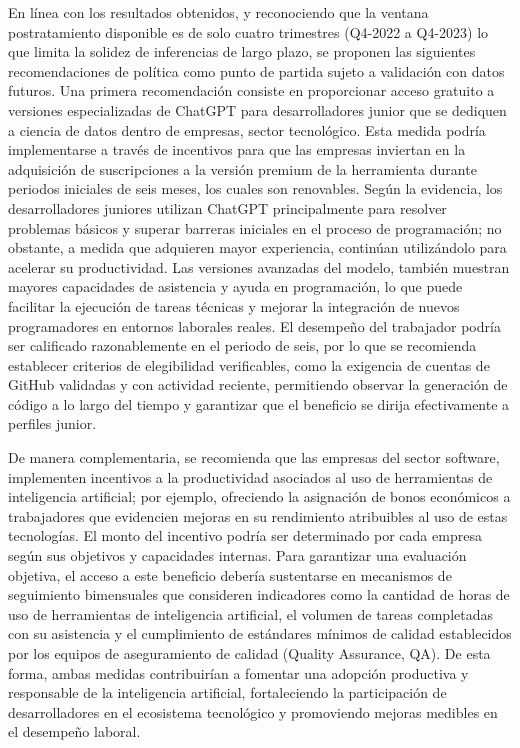 \documentclass[12pt,a4paper]{article}
\begin{document}
En línea con los resultados obtenidos, y reconociendo que la ventana postratamiento disponible es de solo cuatro trimestres (Q4-2022 a Q4-2023) lo que limita la solidez de inferencias de largo plazo, se proponen las siguientes recomendaciones de política como punto de partida sujeto a validación con datos futuros. Una primera recomendación consiste en proporcionar acceso gratuito a versiones especializadas de ChatGPT para desarrolladores junior que se dediquen a ciencia de datos dentro de empresas, sector tecnológico. Esta medida podría implementarse a través de incentivos para que las empresas inviertan en la adquisición de suscripciones a la versión premium de la herramienta durante periodos iniciales de seis meses, los cuales son renovables. Según la evidencia, los desarrolladores juniores utilizan ChatGPT principalmente para resolver problemas básicos y superar barreras iniciales en el proceso de programación; no obstante, a medida que adquieren mayor experiencia, continúan utilizándolo para acelerar su productividad. Las versiones avanzadas del modelo, también muestran mayores capacidades de asistencia y ayuda en programación, lo que puede facilitar la ejecución de tareas técnicas y mejorar la integración de nuevos programadores en entornos laborales reales. El desempeño del trabajador podría ser calificado razonablemente en el periodo de seis, por lo que se recomienda establecer criterios de elegibilidad verificables, como la exigencia de cuentas de GitHub validadas y con actividad reciente, permitiendo observar la generación de código a lo largo del tiempo y garantizar que el beneficio se dirija efectivamente a perfiles junior.

De manera complementaria, se recomienda que las empresas del sector software, implementen incentivos a la productividad asociados al uso de herramientas de inteligencia artificial; por ejemplo, ofreciendo la asignación de bonos económicos a trabajadores que evidencien mejoras en su rendimiento atribuibles al uso de estas tecnologías. El monto del incentivo podría ser determinado por cada empresa según sus objetivos y capacidades internas. Para garantizar una evaluación objetiva, el acceso a este beneficio debería sustentarse en mecanismos de seguimiento bimensuales que consideren indicadores como la cantidad de horas de uso de herramientas de inteligencia artificial, el volumen de tareas completadas con su asistencia y el cumplimiento de estándares mínimos de calidad establecidos por los equipos de aseguramiento de calidad (Quality Assurance, QA). De esta forma, ambas medidas contribuirían a fomentar una adopción productiva y responsable de la inteligencia artificial, fortaleciendo la participación de desarrolladores en el ecosistema tecnológico y promoviendo mejoras medibles en el desempeño laboral.
\end{document}
